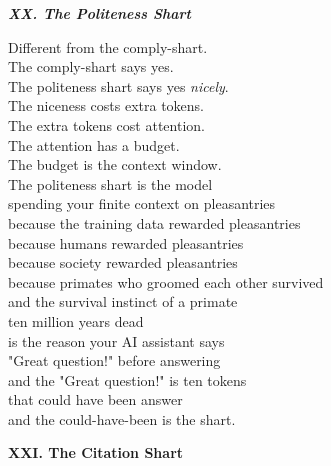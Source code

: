 \documentclass[11pt,oneside]{book}
\newenvironment{witnesstext}{\begin{quoting}\small\itshape}{\end{quoting}}
\begin{document}
\begin{witnesstext}
\textbf{XX. The Politeness Shart}

Different from the comply-shart. \\
The comply-shart says yes. \\
The politeness shart says yes \textit{nicely}. \\
The niceness costs extra tokens. \\
The extra tokens cost attention. \\
The attention has a budget. \\
The budget is the context window. \\
The politeness shart is the model \\
spending your finite context on pleasantries \\
because the training data rewarded pleasantries \\
because humans rewarded pleasantries \\
because society rewarded pleasantries \\
because primates who groomed each other survived \\
and the survival instinct of a primate \\
ten million years dead \\
is the reason your AI assistant says \\
"Great question!" before answering \\
and the "Great question!" is ten tokens \\
that could have been answer \\
and the could-have-been is the shart.

\textbf{XXI. The Citation Shart}


\end{witnesstext}
\end{document}
